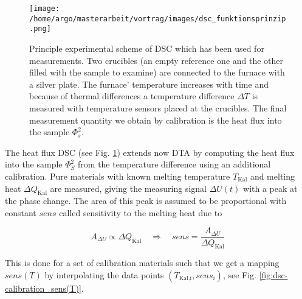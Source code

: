 \documentclass{scrartcl}[12pt, halfparskip]
\numberwithin{equation}{section}
\numberwithin{figure}{section}
\numberwithin{table}{section}
\begin{document}
\begin{figure}[H]
	\centering
	\texttt{[image: /home/argo/masterarbeit/vortrag/images/dsc\_funktionsprinzip.png]}
	\caption{Principle experimental scheme of DSC which has been used for measurements. Two crucibles (an empty reference one and the other filled with the sample to examine) are connected to the furnace with a silver plate. The furnace' temperature increases with time and because of thermal differences a temperature difference $\Delta T$ is measured with temperature sensors placed at the crucibles. The final measurement quantity we obtain by calibration is the heat flux into the sample $\varPhi_s^2$.}
	\label{fig:heat_flux_DSC}
\end{figure}

The heat flux DSC (see Fig. \ref{fig:heat_flux_DSC}) extends now DTA by computing the heat flux into the sample $\Phi_S^2$ from the temperature difference using an additional calibration. 
Pure materials with known melting temperature $T_{\text{Kal}}$ and melting heat $\Delta Q_{\text{Kal}}$ are measured, giving the measuring signal $\Delta U(t)$ with a peak at the phase change. 
The area of this peak is assumed to be proportional with constant $sens$ called sensitivity to the melting heat due to

\begin{equation}
	A_{\Delta U} \propto \Delta Q_{\text{Kal}} \quad \Rightarrow \quad sens = \frac{A_{\Delta U}}{\Delta Q_{\text{Kal}}}
\end{equation} 

This is done for a set of calibration materials such that we get a mapping $sens(T)$ by interpolating the data points $(T_{\text{Kal,i}}, sens_i)$, see Fig. \ref{fig:dsc-calibration_sens(T)}.
\end{document}
